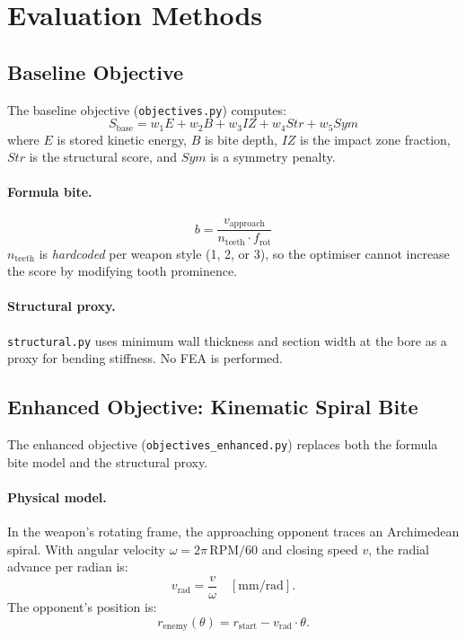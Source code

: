 \documentclass[10pt,twocolumn]{article}
\begin{document}
\section{Evaluation Methods}
\label{sec:eval}

\subsection{Baseline Objective}
\label{sec:baseline_obj}

The baseline objective (\texttt{objectives.py}) computes:
\begin{equation}
  S_{\mathrm{base}} = w_1 E + w_2 B + w_3 \mathit{IZ} + w_4 \mathit{Str} + w_5 \mathit{Sym}
\end{equation}
where $E$ is stored kinetic energy, $B$ is bite depth, $\mathit{IZ}$ is the
impact zone fraction, $\mathit{Str}$ is the structural score, and
$\mathit{Sym}$ is a symmetry penalty.

\paragraph{Formula bite.}
\begin{equation}
  b = \frac{v_{\mathrm{approach}}}{n_{\mathrm{teeth}} \cdot f_{\mathrm{rot}}}
\end{equation}
$n_{\mathrm{teeth}}$ is \emph{hardcoded} per weapon style (1, 2, or 3), so
the optimiser cannot increase the score by modifying tooth prominence.

\paragraph{Structural proxy.}
\texttt{structural.py} uses minimum wall thickness and section width at the
bore as a proxy for bending stiffness.  No FEA is performed.

\subsection{Enhanced Objective: Kinematic Spiral Bite}
\label{sec:spiral}

The enhanced objective (\texttt{objectives\_enhanced.py}) replaces both the
formula bite model and the structural proxy.

\paragraph{Physical model.}
In the weapon's rotating frame, the approaching opponent traces an
Archimedean spiral.  With angular velocity $\omega = 2\pi\,\mathrm{RPM}/60$
and closing speed $v$, the radial advance per radian is:
\begin{equation}
  v_{\mathrm{rad}} = \frac{v}{\omega} \quad [\text{mm/rad}].
\end{equation}
The opponent's position is:
\begin{equation}
  r_{\mathrm{enemy}}(\theta) = r_{\mathrm{start}} - v_{\mathrm{rad}} \cdot \theta.
  \label{eq:spiral}
\end{equation}
\end{document}

